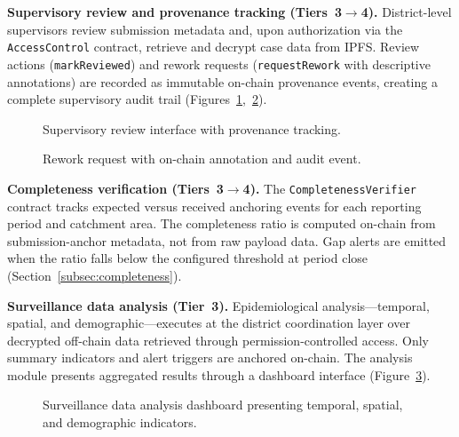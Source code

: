 \textbf{Supervisory review and provenance tracking (Tiers~3$\rightarrow$4).} District-level supervisors review submission metadata and, upon authorization via the \texttt{AccessControl} contract, retrieve and decrypt case data from IPFS. Review actions (\texttt{markReviewed}) and rework requests (\texttt{requestRework} with descriptive annotations) are recorded as immutable on-chain provenance events, creating a complete supervisory audit trail (Figures~\ref{fig:review},~\ref{fig:feedback}).

\begin{figure}[!ht]
\centering
{}
\caption{Supervisory review interface with provenance tracking.}\label{fig:review}
\end{figure}

\begin{figure}[!ht]
\centering
{}
\caption{Rework request with on-chain annotation and audit event.}\label{fig:feedback}
\end{figure}

\textbf{Completeness verification (Tiers~3$\rightarrow$4).} The \texttt{CompletenessVerifier} contract tracks expected versus received anchoring events for each reporting period and catchment area. The completeness ratio is computed on-chain from submission-anchor metadata, not from raw payload data. Gap alerts are emitted when the ratio falls below the configured threshold at period close (Section~\ref{subsec:completeness}).

\textbf{Surveillance data analysis (Tier~3).} Epidemiological analysis---temporal, spatial, and demographic---executes at the district coordination layer over decrypted off-chain data retrieved through permission-controlled access. Only summary indicators and alert triggers are anchored on-chain. The analysis module presents aggregated results through a dashboard interface (Figure~\ref{fig:analysis}).

\begin{figure}[!ht]
\centering
{}
\caption{Surveillance data analysis dashboard presenting temporal, spatial, and demographic indicators.}\label{fig:analysis}
\end{figure}


